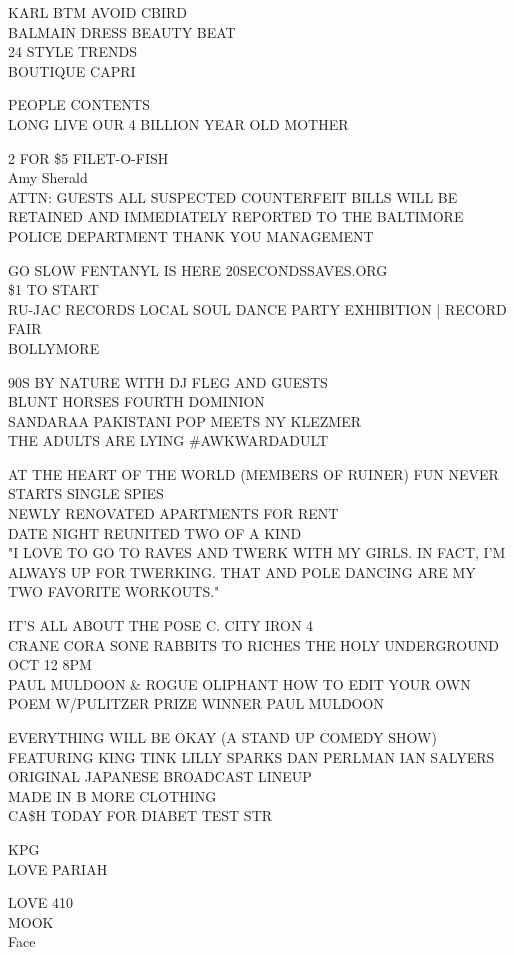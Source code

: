 \documentclass[10pt,letterpaper]{article}
\begin{document}
KARL BTM AVOID CBIRD\\
BALMAIN DRESS BEAUTY BEAT\\
24 STYLE TRENDS\\
BOUTIQUE CAPRI

PEOPLE CONTENTS\\
LONG LIVE OUR 4 BILLION YEAR OLD MOTHER

2 FOR \$5 FILET{-}O{-}FISH\\
Amy Sherald\\
ATTN: GUESTS ALL SUSPECTED COUNTERFEIT BILLS WILL BE RETAINED AND IMMEDIATELY REPORTED TO THE BALTIMORE POLICE DEPARTMENT THANK YOU MANAGEMENT

GO SLOW FENTANYL IS HERE 20SECONDSSAVES.ORG\\
\$1 TO START\\
RU{-}JAC RECORDS LOCAL SOUL DANCE PARTY EXHIBITION | RECORD FAIR\\
BOLLYMORE

90S BY NATURE WITH DJ FLEG AND GUESTS\\
BLUNT HORSES FOURTH DOMINION\\
SANDARAA PAKISTANI POP MEETS NY KLEZMER\\
THE ADULTS ARE LYING \#AWKWARDADULT

AT THE HEART OF THE WORLD (MEMBERS OF RUINER) FUN NEVER STARTS SINGLE SPIES\\
NEWLY RENOVATED APARTMENTS FOR RENT\\
DATE NIGHT REUNITED TWO OF A KIND\\
"I LOVE TO GO TO RAVES AND TWERK WITH MY GIRLS.  IN FACT, I'M ALWAYS UP FOR TWERKING.  THAT AND POLE DANCING ARE MY TWO FAVORITE WORKOUTS."

IT'S ALL ABOUT THE POSE C. CITY IRON 4\\
CRANE CORA SONE RABBITS TO RICHES THE HOLY UNDERGROUND OCT 12 8PM\\
PAUL MULDOON \& ROGUE OLIPHANT HOW TO EDIT YOUR OWN POEM W/PULITZER PRIZE WINNER PAUL MULDOON

EVERYTHING WILL BE OKAY (A STAND UP COMEDY SHOW) FEATURING KING TINK LILLY SPARKS DAN PERLMAN IAN SALYERS\\
ORIGINAL JAPANESE BROADCAST LINEUP\\
MADE IN B MORE CLOTHING\\
CA\$H TODAY FOR DIABET TEST STR

KPG\\
LOVE PARIAH

LOVE 410\\
MOOK\\
Face
\end{document}
